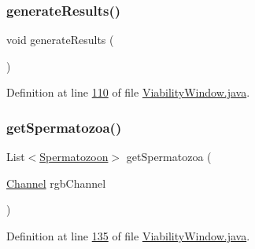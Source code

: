 \hypertarget{classgui_1_1_viability_window_a754be7a1ad7ccf944469a5960baf52b3}{}\label{classgui_1_1_viability_window_a754be7a1ad7ccf944469a5960baf52b3} 
\subsubsection{\texorpdfstring{generate\+Results()}{generateResults()}}
{\footnotesize\ttfamily void generate\+Results (\begin{DoxyParamCaption}{ }\end{DoxyParamCaption})\hspace{0.3cm}{\ttfamily [private]}}



Definition at line \hyperlink{_viability_window_8java_source_l00110}{110} of file \hyperlink{_viability_window_8java_source}{Viability\+Window.\+java}.

\hypertarget{classgui_1_1_viability_window_a21bfc28b8acdf4451eec7e3bc2060c61}{}\label{classgui_1_1_viability_window_a21bfc28b8acdf4451eec7e3bc2060c61} 
\subsubsection{\texorpdfstring{get\+Spermatozoa()}{getSpermatozoa()}}
{\footnotesize\ttfamily List$<$\hyperlink{classdata_1_1_spermatozoon}{Spermatozoon}$>$ get\+Spermatozoa (\begin{DoxyParamCaption}\item[{\hyperlink{enumgui_1_1_viability_window_1_1_channel}{Channel}}]{rgb\+Channel }\end{DoxyParamCaption})\hspace{0.3cm}{\ttfamily [private]}}



Definition at line \hyperlink{_viability_window_8java_source_l00135}{135} of file \hyperlink{_viability_window_8java_source}{Viability\+Window.\+java}.

\hypertarget{classgui_1_1_viability_window_a45d56bd84238e8b56589dfc732e2b2cf}{}\label{classgui_1_1_viability_window_a45d56bd84238e8b56589dfc732e2b2cf} 

